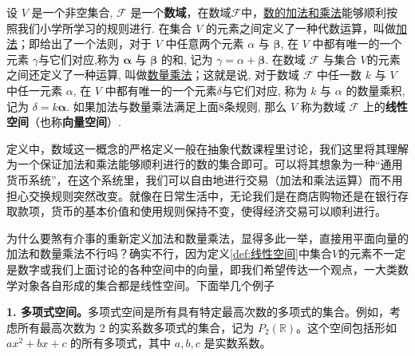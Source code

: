 
\begin{definition}[线性空间]
\label{def:线性空间}
设 $V$ 是一个非空集合, $\mathcal{F}$ 是一个\textcolor{third}{\bf 数域}，在数域$\mathcal{F}$中，\underline{数的加法和乘法}能够顺利按照我们小学所学习的规则进行. 在集合 $V$ 的元素之间定义了一种代数运算，叫做\underline{加法}；即给出了一个法则，对于 $V$ 中任意两个元素 $\alpha$ 与 $\boldsymbol{\beta}$, 在 $V$ 中都有唯一的一个元素 $\gamma$与它们对应,称为 $\boldsymbol{\alpha}$ 与 $\boldsymbol{\beta}$ 的和, 记为 $\gamma=\alpha+\boldsymbol{\beta}$. 在数域 $\mathcal{F}$ 与集合 $V$的元素之间还定义了一种运算, 叫做\underline{数量乘法}；这就是说, 对于数域 $\mathcal{F}$ 中任一数 $k$ 与 $V$ 中任一元素 $\alpha$, 在 $V$ 中都有唯一的一个元素$\delta$与它们对应, 称为 $k$ 与 $\alpha$ 的数量乘积, 记为 $\delta=k \boldsymbol{\alpha}$. 如果加法与数量乘法满足上面8条规则, 那么 $V$ 称为数域 $\mathcal{F}$ 上的\textcolor{third}{\bf 线性空间}（也称\textcolor{third}{\bf 向量空间}）.
\end{definition}

定义中，数域这一概念的严格定义一般在抽象代数课程里讨论，我们这里将其理解为一个保证加法和乘法能够顺利进行的数的集合即可。可以将其想象为一种“通用货币系统”，在这个系统里，我们可以自由地进行交易（加法和乘法运算）而不用担心交换规则突然改变。就像在日常生活中，无论我们是在商店购物还是在银行存取款项，货币的基本价值和使用规则保持不变，使得经济交易可以顺利进行。

为什么要煞有介事的重新定义加法和数量乘法，显得多此一举，直接用平面向量的加法和数量乘法不行吗？确实不行，因为定义\ref{def:线性空间}中集合$V$的元素不一定是数字或我们上面讨论的各种空间中的向量，即我们希望传达一个观点，一大类数学对象各自形成的集合都是线性空间。下面举几个例子

\textbf{1. 多项式空间。}多项式空间是所有具有特定最高次数的多项式的集合。例如，考虑所有最高次数为 2 的实系数多项式的集合，记为 \(P_2(\mathbb{R})\)。这个空间包括形如 \(ax^2 + bx + c\) 的所有多项式，其中 \(a, b, c\) 是实数系数。

